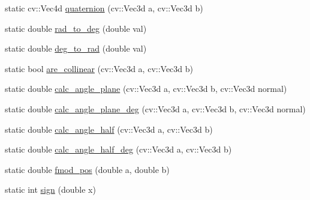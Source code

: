 \begin{DoxyCompactItemize}
\item 
static cv\-::\-Vec4d \hyperlink{classmae_1_1math_1_1internal__math_ae53e17de10b74947e3b85fb9870b8a93}{quaternion} (cv\-::\-Vec3d a, cv\-::\-Vec3d b)
\item 
static double \hyperlink{classmae_1_1math_1_1internal__math_a5f7f634e24ca7eddcb721d83ee2a6586}{rad\-\_\-to\-\_\-deg} (double val)
\item 
static double \hyperlink{classmae_1_1math_1_1internal__math_a1e97d1065baf71089d48b55eb54ce419}{deg\-\_\-to\-\_\-rad} (double val)
\item 
static bool \hyperlink{classmae_1_1math_1_1internal__math_a19b2a00509554e1e67a514f97dbefb6e}{are\-\_\-collinear} (cv\-::\-Vec3d a, cv\-::\-Vec3d b)
\item 
static double \hyperlink{classmae_1_1math_1_1internal__math_ac71978194a7897e970fb08fd5a3d11eb}{calc\-\_\-angle\-\_\-plane} (cv\-::\-Vec3d a, cv\-::\-Vec3d b, cv\-::\-Vec3d normal)
\item 
static double \hyperlink{classmae_1_1math_1_1internal__math_a865dd9ed9229051f10e61ec5744d3459}{calc\-\_\-angle\-\_\-plane\-\_\-deg} (cv\-::\-Vec3d a, cv\-::\-Vec3d b, cv\-::\-Vec3d normal)
\item 
static double \hyperlink{classmae_1_1math_1_1internal__math_acc5d7e694fa30f784a2f4d6f95fa6c6d}{calc\-\_\-angle\-\_\-half} (cv\-::\-Vec3d a, cv\-::\-Vec3d b)
\item 
static double \hyperlink{classmae_1_1math_1_1internal__math_a1a0726bba8e668b09aeadd29496675fc}{calc\-\_\-angle\-\_\-half\-\_\-deg} (cv\-::\-Vec3d a, cv\-::\-Vec3d b)
\item 
static double \hyperlink{classmae_1_1math_1_1internal__math_afe81884133781a9e249f3f3a89e1388c}{fmod\-\_\-pos} (double a, double b)
\item 
static int \hyperlink{classmae_1_1math_1_1internal__math_a04bbf2f7612b4514b64b05d59d294aa1}{sign} (double x)
\end{DoxyCompactItemize}


